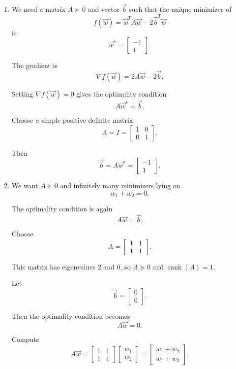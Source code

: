 \documentclass[
  12pt,
]{fphw}
\begin{document}
\begin{enumerate}

\item[(a)]

We need a matrix $A \succ 0$ and vector $\vec b$ such that the unique minimizer of
\[
f(\vec w)=\vec w^T A \vec w - 2\vec b^T \vec w
\]
is
\[
\vec w^\star=
\begin{bmatrix}
-1\\
1
\end{bmatrix}.
\]

The gradient is
\[
\nabla f(\vec w)=2A\vec w-2\vec b.
\]

Setting $\nabla f(\vec w)=0$ gives the optimality condition
\[
A\vec w^\star=\vec b.
\]

Choose a simple positive definite matrix
\[
A=I=
\begin{bmatrix}
1 & 0\\
0 & 1
\end{bmatrix}.
\]

Then
\[
\vec b=A\vec w^\star=
\begin{bmatrix}
-1\\
1
\end{bmatrix}.
\]

\item[(b)]

We want $A\succeq0$ and infinitely many minimizers lying on
\[
w_1+w_2=0.
\]

The optimality condition is again
\[
A\vec w=\vec b.
\]

Choose
\[
A=
\begin{bmatrix}
1&1\\
1&1
\end{bmatrix}.
\]

This matrix has eigenvalues $2$ and $0$, so $A\succeq0$ and $\operatorname{rank}(A)=1$.

Let
\[
\vec b=
\begin{bmatrix}
0\\
0
\end{bmatrix}.
\]

Then the optimality condition becomes
\[
A\vec w=0.
\]

Compute
\[
A\vec w=
\begin{bmatrix}
1&1\\
1&1
\end{bmatrix}
\begin{bmatrix}
w_1\\
w_2
\end{bmatrix}
=
\begin{bmatrix}
w_1+w_2\\
w_1+w_2
\end{bmatrix}.
\]


\end{enumerate}
\end{document}

